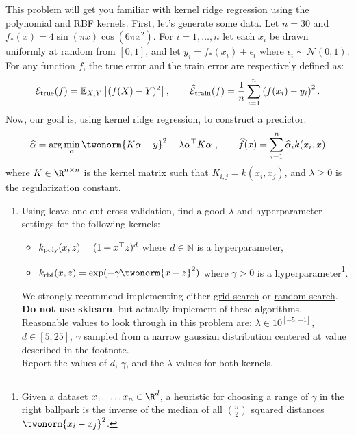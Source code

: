 \documentclass{article}
\begin{document}
\begin{aprob}
    This problem will get you familiar with kernel ridge regression using the polynomial and RBF kernels.
    First, let's generate some data. Let $n=30$ and $f_*(x) = 4 \sin(\pi x)\cos(6\pi x^2)$.
    For $i=1,\dots,n$ let each $x_i$ be drawn uniformly at random from $[0,1]$, and let $y_i = f_*(x_i) + \epsilon_i$ where $\epsilon_i \sim \mathcal{N}(0,1)$.
    For any function $f$, the true error and the train error are respectively defined as:
    $$\mathcal{E}_{\rm true}(f) = \mathbb{E}_{X,Y}\left[(f(X) - Y)^2\right], \quad \quad  \widehat{\mathcal{E}}_{\rm train}(f) =  \frac{1}{n} \sum_{i=1}^n \left(f(x_i)-y_i\right)^2.$$
    Now, our goal is, using kernel ridge regression, to construct a predictor:
    $$\widehat{\alpha} = \arg\min_\alpha \twonorm{K\alpha - y}^2 + \lambda \alpha^\top K \alpha \ , \quad \quad \widehat{f}(x) = \sum_{i=1}^n \widehat{\alpha}_i k(x_i,x)$$
    where $K\in\R^{n\times n}$ is the kernel matrix such that $K_{i,j} = k(x_i,x_j)$, and $\lambda\geq 0$ is the regularization constant.
    
    \begin{enumerate}
        \item {} Using leave-one-out cross validation, find a good $\lambda$ and hyperparameter settings for the following kernels:
        \begin{itemize}
            \item $k_{\rm poly}(x,z) = (1+x^\top z)^d$ where $d \in \mathbb{N}$ is a hyperparameter, 
            \item $k_{\rm rbf}(x,z) = \exp(-\gamma \twonorm{x-z}^2)$ where $\gamma > 0$ is a hyperparameter\footnote{Given a dataset $x_1,\dots,x_n \in \R^d$, a heuristic for choosing a range of $\gamma$ in the right ballpark is the inverse of the median of all $\binom{n}{2}$ squared distances $\twonorm{x_i-x_j}^2$.}.
        \end{itemize}
        We strongly recommend implementing either \href{https://en.wikipedia.org/wiki/Hyperparameter_optimization#Grid_search}{grid search} or \href{https://en.wikipedia.org/wiki/Hyperparameter_optimization#Random_search}{random search}. \textbf{Do not use sklearn}, but actually implement of these algorithms. Reasonable values to look through in this problem are: $\lambda \in 10^{[-5, -1]}$, $d \in [5, 25]$, $\gamma$ sampled from a narrow gaussian distribution centered at value described in the footnote. \\
        Report the values of $d$, $\gamma$, and the $\lambda$ values for both kernels.
        

\end{enumerate}
\end{aprob}
\end{document}
